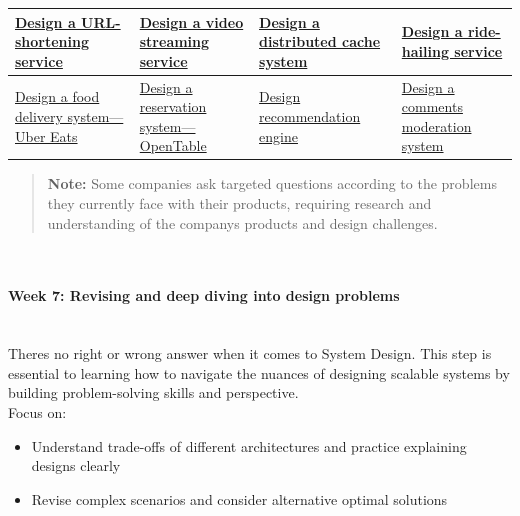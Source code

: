 \begin{table}[htbp]
{\begin{tabular}{|p{}|p{}|p{}|p{}|}
\hline
\href{https://www.educative.io/courses/grokking-modern-system-design-interview-for-engineers-managers/system-design-tinyurl}{Design a URL-shortening service} & \href{https://www.educative.io/courses/grokking-the-system-design-interview/system-design-youtube}{Design a video streaming service} & \href{https://www.educative.io/courses/grokking-the-system-design-interview/system-design-the-distributed-cache}{Design a distributed cache system} & \href{https://www.educative.io/courses/grokking-the-system-design-interview/system-design-uber}{Design a ride-hailing service} \\
\hline
\href{https://www.educative.io/blog/system-design-interview-questions}{Design a food delivery system---Uber Eats} & \href{https://www.educative.io/blog/system-design-interview-questions}{Design a reservation system---OpenTable} & \href{https://www.educative.io/blog/system-design-interview-questions}{Design recommendation engine} & \href{https://www.educative.io/blog/system-design-interview-questions}{Design a comments moderation system} \\
\hline
\end{tabular}
}
\end{table}

\begin{quote}
\textbf{Note:} Some companies ask targeted questions according to the problems they currently face with their products, requiring research and understanding of the company\textquotesingle s products and design challenges.
\end{quote}
\\
\paragraph{Week 7: Revising and deep diving into design problems}\label{7ergIgM7jU-B_RYrb_zbW}
\\
There\textquotesingle s no right or wrong answer when it comes to System Design. This step is essential to learning how to navigate the nuances of designing scalable systems by building problem-solving skills and perspective.
\\
Focus on:

\begin{itemize}
\item
\protect{}\label{bK0njiedj34gZG9CJpfvT}
Understand trade-offs of different architectures and practice explaining designs clearly
\item
\protect{}\label{7Chr4preYZcuSnqIESPyA}
Revise complex scenarios and consider alternative optimal solutions
\end{itemize}
\\
